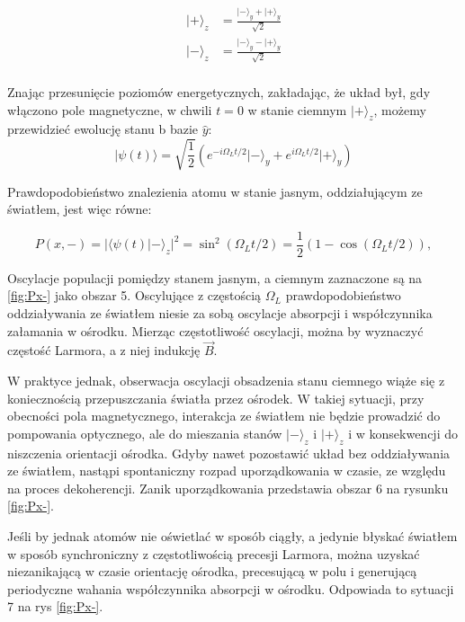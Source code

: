 \documentclass[a4paper,10pt,twoside]{report}
\begin{document}
\begin{align}
\lvert + \rangle_z &=\frac{\lvert - \rangle_y + \lvert + \rangle_y}{\sqrt{2}}\\
\lvert - \rangle_z &=\frac{\lvert - \rangle_y - \lvert + \rangle_y}{\sqrt{2}}\\
\end{align}

Znając przesunięcie poziomów energetycznych, zakładając, że układ był, gdy włączono pole magnetyczne, w chwili $t=0$ w stanie ciemnym $\lvert + \rangle_z$, możemy przewidzieć ewolucję stanu b bazie $\hat y$:
\begin{equation}
\lvert \psi(t) \rangle = \sqrt{\frac{1}{2}} \left( e^{-i \Omega_L t/2} \lvert - \rangle_y + e^{i \Omega_L t/2} \lvert + \rangle_y \right)
\end{equation} 
 
Prawdopodobieństwo znalezienia atomu w stanie jasnym, oddziałującym ze światłem, jest więc równe:

 \begin{equation}
P \left( x,- \right)= \lvert \langle \psi(t) \lvert - \rangle_z \rvert^2 = \sin^2 (\Omega_L t/2)= \frac{1}{2}\left(1-\cos(\Omega_L t/2) \right),
\label{Px-} 
\end{equation} 

Oscylacje populacji pomiędzy stanem jasnym, a ciemnym zaznaczone są na \ref{fig:Px-} jako obszar 5. Oscylujące z częstością $\Omega_L$ prawdopodobieństwo oddziaływania ze światłem niesie za sobą oscylacje absorpcji i współczynnika załamania w ośrodku. Mierząc częstotliwość oscylacji, można by wyznaczyć częstość Larmora, a z niej indukcję $\vec B$.


W praktyce jednak, obserwacja oscylacji obsadzenia stanu ciemnego wiąże się z koniecznością przepuszczania światła przez ośrodek. W takiej sytuacji, przy obecności pola magnetycznego, interakcja ze światłem nie będzie prowadzić do pompowania optycznego, ale do mieszania stanów $\lvert - \rangle_z$ i $\lvert + \rangle_z$ i w konsekwencji do niszczenia orientacji ośrodka. Gdyby nawet pozostawić układ bez oddziaływania ze światłem, nastąpi spontaniczny rozpad uporządkowania w czasie, ze względu na proces dekoherencji. Zanik uporządkowania przedstawia obszar 6 na rysunku \ref{fig:Px-}.

Jeśli by jednak atomów nie oświetlać w sposób ciągły, a jedynie błyskać światłem w sposób synchroniczny z częstotliwością precesji Larmora, można uzyskać niezanikającą w czasie orientację ośrodka, precesującą w polu i generującą periodyczne wahania współczynnika absorpcji w ośrodku. Odpowiada
to sytuacji 7 na rys \ref{fig:Px-}.
\end{document}
